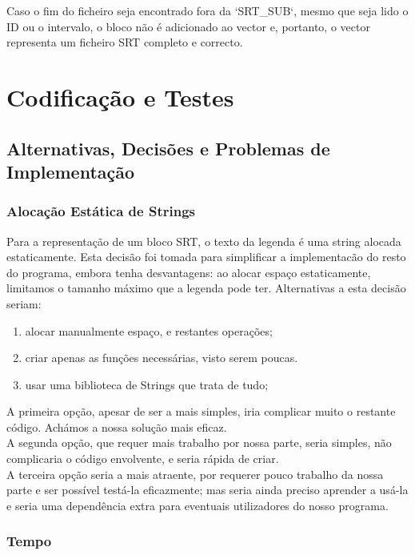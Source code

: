 \documentclass{report}
\begin{document}
Caso o fim do ficheiro seja encontrado fora da `SRT\_SUB`, mesmo que seja lido o ID ou o intervalo, o bloco não é adicionado ao vector e, portanto, o vector representa um ficheiro SRT completo e correcto.

\chapter{Codificação e Testes}

\section{Alternativas, Decisões e Problemas de Implementação}

\subsection{Alocação Estática de Strings}

Para a representação de um bloco SRT, o texto da legenda é uma string alocada estaticamente. Esta decisão foi tomada para simplificar a implementacão do resto do programa, embora tenha desvantagens: ao alocar espaço estaticamente, limitamos o tamanho máximo que a legenda pode ter. 
Alternativas a esta decisão seriam:

\begin{enumerate}
    \item alocar manualmente espaço, e restantes operações;
    \item criar apenas as funções necessárias, visto serem poucas.
    \item usar uma biblioteca de Strings que trata de tudo;
\end{enumerate}

A primeira opção, apesar de ser a mais simples, iria complicar muito o restante código. Achámos a nossa solução mais eficaz.\\
A segunda opção, que requer mais trabalho por nossa parte, seria simples, não complicaria o código envolvente, e seria rápida de criar.\\
A terceira opção seria a mais atraente, por requerer pouco trabalho da nossa parte e ser possível testá-la eficazmente; mas seria ainda preciso aprender a usá-la e seria uma dependência extra para eventuais utilizadores do nosso programa.

\subsection{Tempo}
\end{document}
